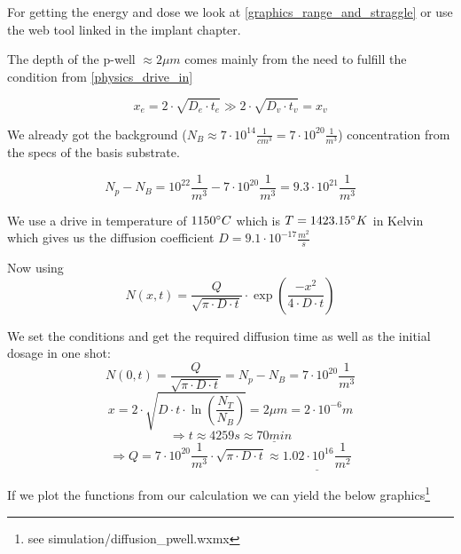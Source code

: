 For getting the energy and dose we look at \autoref{graphics_range_and_straggle} or use the web tool linked in the implant chapter.

The depth of the p-well $\approx 2 \mu m$ comes mainly from the need to fulfill the condition from \autoref{physics_drive_in}

\begin{equation}
x_e = 2 \cdot \sqrt{D_e \cdot t_e} \gg 2 \cdot \sqrt{D_v \cdot t_v} = x_v
\end{equation}

\newpage

We already got the background ($N_B \approx 7 \cdot 10^{14} \frac{1}{cm^3}=7 \cdot 10^{20} \frac{1}{m^3}$) concentration from the specs of the basis substrate.

\begin{equation}
N_p - N_B = 10^{22}\frac{1}{m^3} - 7 \cdot 10^{20} \frac{1}{m^3} = 9.3 \cdot 10^{21} \frac{1}{m^3}
\end{equation}

We use a drive in temperature of $1150 \degree C$ which is  $T = 1423.15 \degree K$ in Kelvin which gives us the diffusion coefficient $D=9.1 \cdot 10^{-17}  \frac{m^2}{s}$

Now using
\begin{equation}
N(x,t)
=
\frac{Q}{\sqrt{\pi\cdot D \cdot t}} \cdot \exp\left(\frac{-x^2}{4 \cdot D \cdot t}\right)
\end{equation}

We set the conditions and get the required diffusion time as well as the initial dosage in one shot:
\begin{equation}
N(0,t)
=
\frac{Q}{\sqrt{\pi\cdot D \cdot t}}
=
N_p-N_B
=
7 \cdot 10^{20} \frac{1}{m^3}
\end{equation}
\begin{equation}
x
=
2 \cdot \sqrt{D \cdot t \cdot\ln\left(\frac{N_T}{N_B}\right)}
=
2 \mu m
=
2 \cdot 10^{-6} m
\end{equation}
\begin{equation}
\Rightarrow
t \approx 4259s \approx \underline{70 min}
\end{equation}
\begin{equation}
\Rightarrow
Q
=
7 \cdot 10^{20} \frac{1}{m^3} \cdot \sqrt{\pi\cdot D \cdot t}
\approx
\underline{1.02 \cdot 10^{16} \frac{1}{m^2}}
\end{equation}

If we plot the functions from our calculation we can yield the below graphics\footnote{see simulation/diffusion\_pwell.wxmx}


